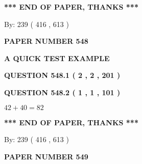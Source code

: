 \documentclass[12pt]{article}
\begin{document}
   
   
\vspace{1.0in} 
{\textbf{\large{ *** END OF PAPER, THANKS *** }}} 
   
   
\hspace{1.0in} By: 
 239 ( 416 ,  613 )
   
   
   
   
\newpage 
\setcounter{page}{ 
   548001 } 
   
   
   
   
 {\textbf{ \Large{ PAPER NUMBER  548  }}}
   
   
\vspace{0.2in}
   
   
   
   
   
   
 \vspace{0.2in}
{\LARGE {\textbf{ A QUICK TEST EXAMPLE}}}
   
   
  
\vspace{0.2in}
  
{\textbf{\Large{QUESTION
548.1 
 ( 2 , 2 , 201 )
}}}
  
  
  
\vspace{0.2in}
  
{\textbf{\Large{QUESTION
548.2 
 ( 1 , 1 , 101 )
}}}
  
  
 
 

$ %
42 +  %
40=   %
82$
 
 
   
   
 \vspace{0.2in}
 
   
   
   
   
\vspace{1.0in} 
{\textbf{\large{ *** END OF PAPER, THANKS *** }}} 
   
   
\hspace{1.0in} By: 
 239 ( 416 ,  613 )
   
   
   
   
\newpage 
\setcounter{page}{ 
   549001 } 
   
   
   
   
 {\textbf{ \Large{ PAPER NUMBER  549  }}}
   
   
\vspace{0.2in}
   
\end{document}
